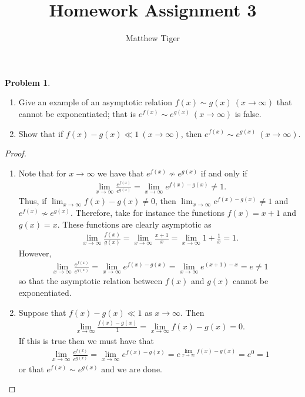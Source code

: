 \documentclass[12pt]{article}
\title{Homework Assignment 3}
\author{Matthew Tiger}
\theoremstyle{definition}
\newtheorem{problem}{Problem}
\begin{document}
\maketitle


\begin{problem}
  \begin{enumerate}
    \item Give an example of an asymptotic relation $f(x) \sim g(x)\ (x \to \infty)$
      that cannot be exponentiated; that is $e^{f(x)} \sim e^{g(x)}\ (x \to \infty)$ is false.
    \item Show that if $f(x) - g(x) \ll 1\ (x \to \infty)$, then $e^{f(x)} \sim e^{g(x)}\ (x \to \infty)$.
  \end{enumerate}
\end{problem}

\begin{proof}
  \begin{enumerate}
    \item Note that for $x\to\infty$ we have that $e^{f(x)} \not\sim e^{g(x)}$ if and only if
      \begin{align*}
        \lim_{x \to \infty}\frac{e^{f(x)}}{e^{g(x)}} = \lim_{x \to \infty} e^{f(x) - g(x)} \neq 1.
      \end{align*}
      Thus, if $\lim_{x\to\infty} f(x) - g(x) \neq 0$, then $\lim_{x \to \infty} e^{f(x) - g(x)} \neq 1$ and $e^{f(x)} \not\sim e^{g(x)}$.
      Therefore, take for instance the functions $f(x) = x + 1$ and $g(x) = x$. These functions are clearly asymptotic
      as
      \begin{align*}
        \lim_{x\to\infty} \frac{f(x)}{g(x)} = \lim_{x\to\infty} \frac{x + 1}{x} = \lim_{x\to\infty} 1 + \frac{1}{x} = 1.
      \end{align*}
      However,
      \begin{align*}
        \lim_{x \to \infty}\frac{e^{f(x)}}{e^{g(x)}} =         \lim_{x \to \infty} e^{f(x) - g(x)} = \lim_{x \to \infty}e^{(x+1) - x} = e \neq 1
      \end{align*}
      so that the asymptotic relation between $f(x)$ and $g(x)$ cannot be exponentiated.
    \item
      Suppose that $f(x) - g(x) \ll 1$ as $x\to\infty$. Then
      \begin{align*}
        \lim_{x\to\infty}\frac{f(x) - g(x)}{1} = \lim_{x\to\infty} f(x) - g(x) = 0.
      \end{align*}
      If this is true then we must have that
      \begin{align*}
        \lim_{x \to \infty}\frac{e^{f(x)}}{e^{g(x)}} = \lim_{x \to \infty} e^{f(x) - g(x)} = e^{\lim_{x \to \infty} f(x) - g(x)} = e^{0} = 1
      \end{align*}
      or that $e^{f(x)} \sim e^{g(x)}$ and we are done.

  \end{enumerate}
\end{proof}
\newpage
\end{document}

